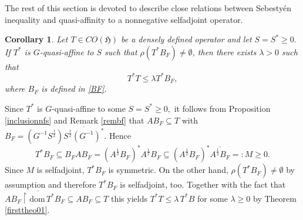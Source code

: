 \documentclass{amsart}
\makeatletter
\newtheorem{corollary}[theorem]{Corollary}
\newcommand{\vide}{\emptyset}
\newcommand{\h}{\mathfrak{H}}
\newcommand{\D}{\mathrm{dom}\,}
\newcommand{\adj}{^*}
\newcommand{\inv}{^{-1}}
\newcommand{\tstar}{T^{*}}
\newcommand{\half}{^{\frac{1}{2}}}
\newcommand{\inclu}{\subseteq}
\newcommand{\rest}{\upharpoonright}
\numberwithin{equation}{section}
\renewenvironment{proof}[1][\proofname]{%
   \par\pushQED{\qed}\normalfont%
   \topsep6\p@\@plus6\p@\relax
   \trivlist\item[\hskip\labelsep\bfseries#1\@addpunct{.}]%
   \ignorespaces
}{%
   \popQED\endtrivlist\@endpefalse
}
\makeatother
\begin{document}
The rest of this section is devoted to describe close relations  between Sebestyén inequality and  quasi-affinity to a nonnegative selfadjoint operator.

 \begin{corollary}\label{remsebsqua}
Let $T \in CO(\h)$ be a densely defined operator and let   $S=S\adj \geq 0.$    If  $\tstar$ is $G$-quasi-affine to $S$  such that $\rho ( \tstar B_F) \neq \vide$, then  there exists $\lambda >0$ such that
  $$\tstar T \leq \lambda \tstar B_F,
  $$
where $B_F$ is defined in \eqref{BF}.
\end{corollary}

%
\begin{proof}
  Since $\tstar$ is $G$-quasi-affine to some $S=S\adj \geq 0,$ it follows from Proposition \ref{inclusionnfs} and Remark \ref{rembf} that $AB_F \inclu T$ with $B_F= (G\inv S\half) \overline{S\half  (G\inv)\adj}.$ Hence
  $$
  \tstar B_F \inclu  B_F A B_F= (A\half B_F)\adj A\half B_F  \inclu (A\half B_F)\adj \overline{A\half B_F}=:M \geq 0.
    $$
    Since $M$ is selfadjoint, $\tstar B_F$ is symmetric. On the other hand, $\rho( \tstar B_F) \neq \vide$ by assumption and therefore $\tstar B_F$ is selfadjoint, too.
    Together with the fact that $A  \overline{B_F\rest \D \tstar B_F}  \inclu A B_F \inclu  T $ this yields $T^*T \leq \lambda\, T^*B$ for some   $\lambda \geq 0$ by  Theorem \ref{firsttheo01}.
\end{proof}
\end{document}
